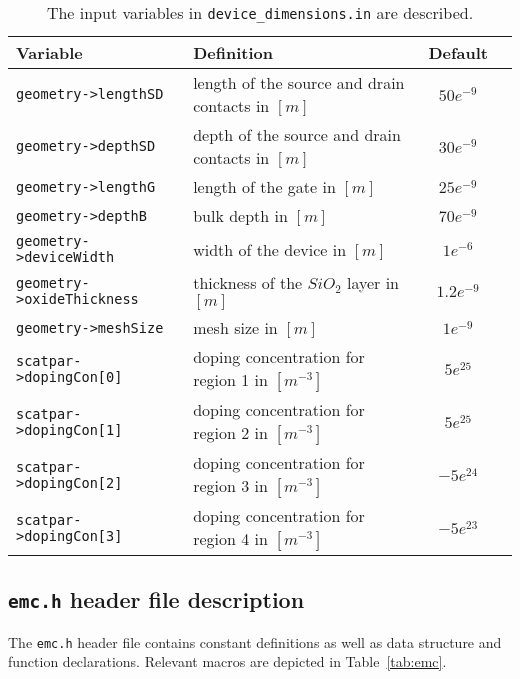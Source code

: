 \begin{table}[ht!]
\centering
\begin{tabular}{|l|p{8.0cm}|c|c|}
\hline
\textbf{Variable}                 &  \textbf{Definition}                              &  \textbf{Default} \\
\hline
\texttt{geometry->lengthSD}       &  length of the source and drain contacts in $[m]$ &  $50e^{-9}$ \\
\hline
\texttt{geometry->depthSD}        &  depth of the source and drain contacts in $[m]$  &  $30e^{-9}$ \\
\hline
\texttt{geometry->lengthG}        &  length of the gate in $[m]$                      &  $25e^{-9}$ \\
\hline
\texttt{geometry->depthB}         &  bulk depth in $[m]$                              &  $70e^{-9}$ \\
\hline
\texttt{geometry->deviceWidth}    &  width of the device in $[m]$                     &  $1e^{-6}$ \\
\hline
\texttt{geometry->oxideThickness} &  thickness of the $SiO_2$ layer in $[m]$          &  $1.2e^{-9}$\\
\hline
\texttt{geometry->meshSize}       &  mesh size in $[m]$                               &  $1e^{-9}$ \\
\hline
\texttt{scatpar->dopingCon{[0]}}  &  doping concentration for region 1 in $[m^{-3}]$  &  $5e^{25}$\\
\hline
\texttt{scatpar->dopingCon{[1]}}  &  doping concentration for region 2 in $[m^{-3}]$  &  $5e^{25}$ \\
\hline
\texttt{scatpar->dopingCon{[2]}}  &  doping concentration for region 3 in $[m^{-3}]$  &  $-5e^{24}$\\
\hline
\texttt{scatpar->dopingCon{[3]}}  &  doping concentration for region 4 in $[m^{-3}]$  &  $-5e^{23}$\\
\hline
\end{tabular}
\caption{The input variables in \texttt{device\_dimensions.in} are described.}
\label{tab:devdim}
\end{table}



\subsection{\texttt{emc.h} header file description}

The \texttt{emc.h} header file contains constant definitions as well as data structure and function declarations.
Relevant macros are depicted in Table~\ref{tab:emc}.

